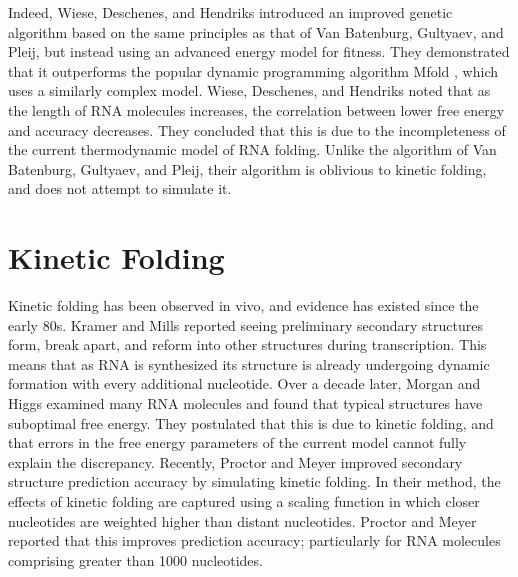 \documentclass{cshonours}
\begin{document}
Indeed, Wiese, Deschenes, and Hendriks \cite{wiese2008rnapredict} introduced an improved
genetic algorithm based on the same principles as that of Van Batenburg, Gultyaev,
and Pleij, but instead using an advanced energy model for fitness. They demonstrated that it outperforms the popular dynamic programming algorithm
Mfold \cite{zuker2003mfold}, which uses a similarly complex model. Wiese, Deschenes, and Hendriks noted that as the length of RNA molecules increases, the correlation between lower free energy and accuracy decreases. They concluded that this is due to the incompleteness of the current thermodynamic model of RNA folding. Unlike the algorithm of Van Batenburg, Gultyaev, and Pleij, their algorithm is oblivious to kinetic folding, and does not attempt to simulate it.

\section{Kinetic Folding}
Kinetic folding has been observed in vivo, and evidence has existed since the early 80s. Kramer and Mills \cite{kramer1981secondary} reported seeing preliminary secondary structures form, break apart, and reform into other structures during transcription. This means that as RNA is synthesized its structure is already undergoing dynamic formation with every additional nucleotide. Over a decade later, Morgan and Higgs \cite{morgan1996evidence} examined many RNA molecules and found that typical structures have suboptimal free energy. They postulated that this is due to kinetic folding, and that errors in the free energy parameters of the current model cannot fully explain the discrepancy. Recently, Proctor and Meyer \cite{proctor2013cofold} improved secondary structure prediction accuracy by simulating kinetic folding. In their method, the effects of kinetic folding are captured using a scaling function in which closer nucleotides are weighted higher than distant nucleotides. Proctor and Meyer \cite{proctor2013cofold} reported that this improves prediction accuracy; particularly for RNA molecules comprising greater than 1000 nucleotides. 
\end{document}
